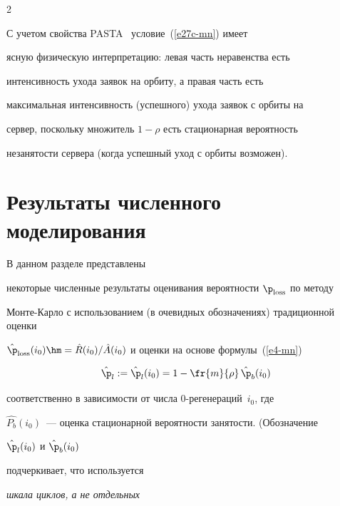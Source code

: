 \begin{multicols}{2}
\begin{equation}
\end{equation}


С учетом свойства PASTA~\cite{Asmus} условие~(\ref{e27c-mn}) имеет


ясную физическую интерпретацию: левая часть неравенства есть


интенсивность ухода заявок на орбиту, а правая часть есть


максимальная интенсивность (успешного) ухода заявок с орбиты на


сервер, поскольку множитель $1-\rho$ есть стационарная вероятность


незанятости сервера (когда  успешный уход с орбиты возможен).






















\section{Результаты численного  моделирования} 





В данном разделе представлены


некоторые чис\-лен\-ные результаты оценивания вероятности  $\p_{\mathrm{loss}}$ по методу


Мон\-те-Кар\-ло с использованием (в очевидных обозначениях) традиционной оценки


$\hat{\p}_{\mathrm{loss}}(i_0)\hm=\hat{R}(i_0)/\hat{A}(i_0)$ и оценки на основе формулы~(\ref{e4-mn})


 $$


  \hat{\p}_l:=\hat{\p}_l(i_0)=1-\fr{m}{\rho}\,\hat{\p}_b(i_0)


$$


 соответственно в зависимости от   чис\-ла 0-ре\-ге\-не\-ра\-ций~$i_0$, где


$\hat{P_b}(i_0)$~--- оценка стационарной вероятности занятости. (Обозначение 


$\hat{\p}_l(i_0)$ и $\hat{\p}_b(i_0)$ 


 подчеркивает, что используется {\it шкала циклов, а не отдельных


}
\end{multicols}
